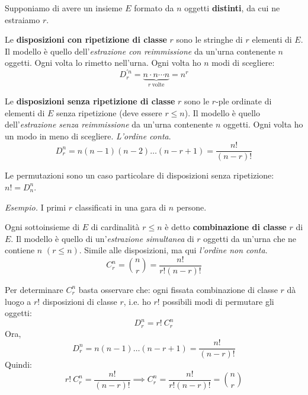 Supponiamo di avere un insieme $E$ formato da $n$ oggetti \textbf{distinti}, da cui ne estraiamo $r$.
\begin{definition}
Le \textbf{disposizioni con ripetizione di classe }$r$ sono le stringhe di $r$ elementi di $E$. Il modello è quello dell'\textit{estrazione con reimmissione} da un'urna contenente $n$ oggetti. Ogni volta lo rimetto nell'urna. Ogni volta ho $n$ modi di scegliere:
\begin{equation*}
\boxed{D^{\prime n}_{r} =\underbrace{n\cdot n\cdots n}_{r\ \text{volte}} =n^{r}}
\end{equation*}
\end{definition}
\begin{definition}
Le \textbf{disposizioni senza ripetizione di classe} $r$ sono le $r$-ple ordinate di elementi di $E$ senza ripetizione (deve essere $r\leq n$). Il modello è quello dell'\textit{estrazione senza reimmissione} da un'urna contenente $n$ oggetti. Ogni volta ho un modo in meno di scegliere. \textit{L'ordine conta}.
\begin{equation*}
\boxed{D_{r}^{n} =n( n-1)( n-2) \dotsc ( n-r+1) =\frac{n!}{( n-r) !}}
\end{equation*}
\end{definition}
\begin{oss}
Le permutazioni sono un caso particolare di disposizioni senza ripetizione: $n!=D_{n}^{n}$.
\end{oss}
\textit{Esempio.} I primi $r$ classificati in una gara di $n$ persone.

\begin{definition}
Ogni sottoinsieme di $E$ di cardinalità $r\leq n$ è detto \textbf{combinazione di classe} $r$ di $E$. Il modello è quello di un'\textit{estrazione simultanea} di $r$ oggetti da un'urna che ne contiene $n$ $( r\leq n)$. Simile alle disposizioni, ma qui \textit{l'ordine non conta}.
\begin{equation*}
\boxed{C_{r}^{n} =\binom{n}{r} =\frac{n!}{r!( n-r) !}}
\end{equation*}
\end{definition}
\begin{oss}
Per determinare $C_{r}^{n}$ basta osservare che: ogni fissata combinazione di classe $r$ dà luogo a $r!$ disposizioni di classe $r$, i.e. ho $r!$ possibili modi di permutare gli oggetti:
\begin{equation*}
D_{r}^{n} =r!\ C_{r}^{n}
\end{equation*}
Ora,
\begin{equation*}
D_{r}^{n} =n( n-1) \dotsc ( n-r+1) =\frac{n!}{( n-r) !}
\end{equation*}
Quindi:
\begin{equation*}
r!\ C_{r}^{n} =\frac{n!}{( n-r) !} \implies C_{r}^{n} =\frac{n!}{r!( n-r) !} =\binom{n}{r}
\end{equation*}
\end{oss}
\Esercizio{}

